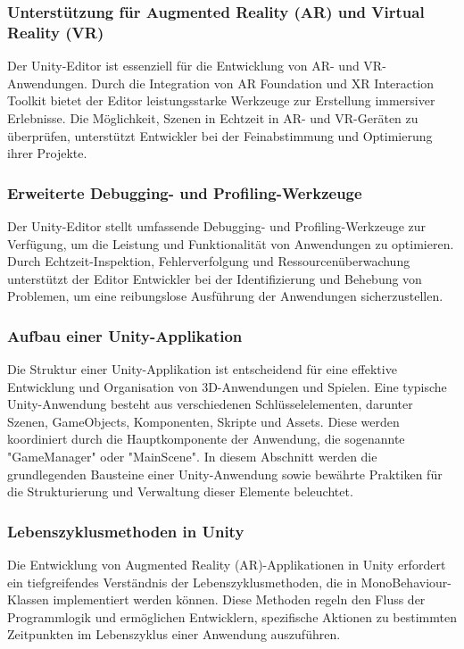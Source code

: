 \subsubsection{Unterstützung für Augmented Reality (AR) und Virtual Reality (VR)}
Der Unity-Editor ist essenziell für die Entwicklung von AR- und VR-Anwendungen. Durch die Integration von AR Foundation
und XR Interaction Toolkit bietet der Editor leistungsstarke Werkzeuge zur Erstellung immersiver Erlebnisse. Die
Möglichkeit, Szenen in Echtzeit in AR- und VR-Geräten zu überprüfen, unterstützt Entwickler bei der Feinabstimmung
und Optimierung ihrer Projekte.

\subsubsection{Erweiterte Debugging- und Profiling-Werkzeuge}
Der Unity-Editor stellt umfassende Debugging- und Profiling-Werkzeuge zur Verfügung, um die Leistung und Funktionalität
von Anwendungen zu optimieren. Durch Echtzeit-Inspektion, Fehlerverfolgung und Ressourcenüberwachung unterstützt der
Editor Entwickler bei der Identifizierung und Behebung von Problemen, um eine reibungslose Ausführung der Anwendungen
sicherzustellen.

\subsubsection{Aufbau einer Unity-Applikation}
Die Struktur einer Unity-Applikation ist entscheidend für eine effektive Entwicklung und Organisation von 3D-Anwendungen
und Spielen. Eine typische Unity-Anwendung besteht aus verschiedenen Schlüsselelementen, darunter Szenen, GameObjects,
Komponenten, Skripte und Assets. Diese werden koordiniert durch die Hauptkomponente der Anwendung, die sogenannte
"GameManager" oder "MainScene". In diesem Abschnitt werden die grundlegenden Bausteine einer Unity-Anwendung sowie
bewährte Praktiken für die Strukturierung und Verwaltung dieser Elemente beleuchtet.

\subsubsection{Lebenszyklusmethoden in Unity}
Die Entwicklung von Augmented Reality (AR)-Applikationen in Unity erfordert ein tiefgreifendes Verständnis der
Lebenszyklusmethoden, die in MonoBehaviour-Klassen implementiert werden können. Diese Methoden regeln den Fluss der
Programmlogik und ermöglichen Entwicklern, spezifische Aktionen zu bestimmten Zeitpunkten im Lebenszyklus einer
Anwendung auszuführen.

